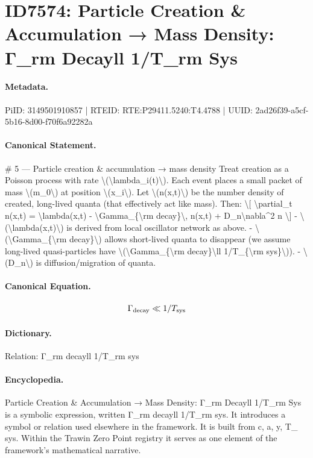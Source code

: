 \section*{ID7574: Particle Creation \& Accumulation → Mass Density: Γ\_rm Decayll 1/T\_rm Sys}
\paragraph{Metadata.}
PiID: 3149501910857 | RTEID: RTE:P29411.5240:T4.4788 | UUID: 2ad26f39-a5cf-5b16-8d00-f70f6a92282a

\paragraph{Canonical Statement.}
\# 5 — Particle creation \& accumulation → mass density Treat creation as a Poisson process with rate \textbackslash{}(\textbackslash{}lambda\_i(t)\textbackslash{}). Each event places a small packet of mass \textbackslash{}(m\_0\textbackslash{}) at position \textbackslash{}(x\_i\textbackslash{}). Let \textbackslash{}(n(x,t)\textbackslash{}) be the number density of created, long-lived quanta (that effectively act like mass). Then: \textbackslash{}[ \textbackslash{}partial\_t n(x,t) = \textbackslash{}lambda(x,t) - \textbackslash{}Gamma\_\{\textbackslash{}rm decay\}\textbackslash{}, n(x,t) + D\_n\textbackslash{}nabla\textasciicircum{}2 n \textbackslash{}] - \textbackslash{}(\textbackslash{}lambda(x,t)\textbackslash{}) is derived from local oscillator network as above. - \textbackslash{}(\textbackslash{}Gamma\_\{\textbackslash{}rm decay\}\textbackslash{}) allows short-lived quanta to disappear (we assume long-lived quasi-particles have \textbackslash{}(\textbackslash{}Gamma\_\{\textbackslash{}rm decay\}\textbackslash{}ll 1/T\_\{\textbackslash{}rm sys\}\textbackslash{})). - \textbackslash{}(D\_n\textbackslash{}) is diffusion/migration of quanta.

\paragraph{Canonical Equation.}
\[
\Gamma_{\rm decay}\ll 1/T_{\rm sys}
\]

\paragraph{Dictionary.}
Relation: Γ\_rm decayll 1/T\_rm sys

\paragraph{Encyclopedia.}
Particle Creation \& Accumulation → Mass Density: Γ\_rm Decayll 1/T\_rm Sys is a symbolic expression, written Γ\_rm decayll 1/T\_rm sys. It introduces a symbol or relation used elsewhere in the framework. It is built from c, a, y, T\_ sys. Within the Trawin Zero Point registry it serves as one element of the framework's mathematical narrative.
